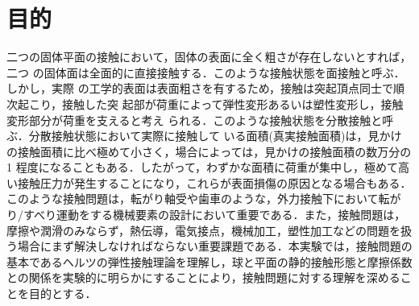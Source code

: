 \section{目的}
二つの固体平面の接触において，固体の表面に全く粗さが存在しないとすれば，二つ
の固体面は全面的に直接接触する．このような接触状態を面接触と呼ぶ．しかし，実際
の工学的表面は表面粗さを有するため，接触は突起頂点同士で順次起こり，接触した突
起部が荷重によって弾性変形あるいは塑性変形し，接触変形部分が荷重を支えると考え
られる．このような接触状態を分散接触と呼ぶ．分散接触状態において実際に接触して
いる面積(真実接触面積)は，見かけの接触面積に比べ極めて小さく，場合によっては，見かけの接触面積の数万分の 1 程度になることもある．したがって，わずかな面積に荷重が集中し，極めて高い接触圧力が発生することになり，これらが表面損傷の原因となる場合もある．このような接触問題は，転がり軸受や歯車のような，外力接触下において転がり/すべり運動をする機械要素の設計において重要である．また，接触問題は，摩擦や潤滑のみならず，熱伝導，電気接点，機械加工，塑性加工などの問題を扱う場合にまず解決しなければならない重要課題である．本実験では，接触問題の基本であるヘルツの弾性接触理論を理解し，球と平面の静的接触形態と摩擦係数との関係を実験的に明らかにすることにより，接触問題に対する理解を深めることを目的とする．